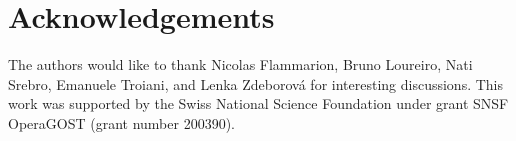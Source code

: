 \section*{Acknowledgements}
The authors would like to thank Nicolas Flammarion, Bruno Loureiro, Nati Srebro, Emanuele Troiani, and Lenka Zdeborov\'a for interesting discussions. This work was supported by the Swiss National Science Foundation under grant SNSF OperaGOST (grant number 200390).

